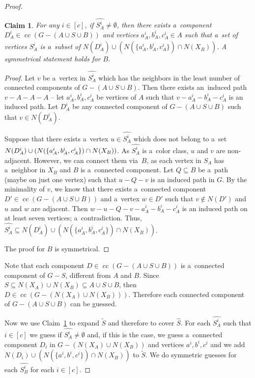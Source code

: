 \documentclass[11pt,a4paper]{article}
\DeclareMathOperator{\cc}{cc}
\newtheorem{claim}[theorem]{Claim}
\theoremstyle{definition}
\begin{document}
\begin{proof}
\begin{claim}\label{cl:other_components}
    For any $i \in [c]$, if $\widehat{S_A^i} \neq \emptyset$,
    then there exists a~component $D_A^i\in \cc(G-(A\cup S\cup B))$ and vertices $a_A^i,b_A^i,c_A^i\in A$ such that a~set of vertices $\widehat{S_A^i}$ is a~subset of $N(D_A^i)\cup (N(\{a_A^i, b_A^i, c_A^i\})\cap N(X_B))$. A symmetrical statement holds for $B$. 
\end{claim}
\begin{proof}
    Let $v$ be a~vertex in $\widehat{S_A^i}$ which has the neighbors in the least number of connected components of $G-(A\cup S\cup B)$. 
    Then there exists an~induced path $v-A-A-A$ -- let $a_A^i, b_A^i, c_A^i$ be vertices of $A$ such that $v-a_A^i-b_A^i-c_A^i$ is an induced path. 
    Let $D_A^i$ be any connected component of $G-(A\cup S\cup B)$ such that $v\in N(D_A^i)$. 
    
    Suppose that there exists a~vertex $u\in \widehat{S_A^i}$ which does not belong to a~set $N(D_A^i)\cup (N(\{a_A^i, b_A^i, c_A^i\}) \linebreak \cap N(X_B))$. As $\widehat{S_A^i}$ is a~color class, $u$ and $v$ are non-adjacent. 
    However, we can connect them via~$B$, as each vertex in $S_A$ has a~neighbor in $X_B$ and $B$ is a~connected component. Let $Q\subseteq B$ be a~path (maybe on just one vertex) such that $u-Q-v$ is an induced path in $G$.
    By the minimality of $v$, we know that there exists a~connected component $D'\in \cc(G-(A\cup S\cup B))$ and a~vertex $w\in D'$ such that $v\notin N(D')$ and $u$ and $w$ are adjacent. Then $w-u-Q-v-a_A^i-b_A^i-c_A^i$ is an induced path on at least seven vertices; a~contradiction. Thus, $\widehat{S_A^i}\subseteq N(D_A^i)\cup (N(\{a_A^i, b_A^i, c_A^i\})\cap N(X_B))$.

    The proof for $B$ is symmetrical.
\end{proof}

Note that each component $D\in \cc(G-(A\cup S\cup B))$ is a~connected component of $G-S$, different from $A$ and $B$. Since $S\subseteq N(X_A)\cup N(X_B)\subseteq A\cup S\cup B$, then $D\in \cc(G-(N(X_A)\cup N(X_B)))$. Therefore each connected component of $G-(A \cup S \cup B)$ can be guessed.

Now we use Claim~\ref{cl:other_components} to expand $\widetilde{S}$ and therefore to cover $\widehat{S}$. For each $\widehat{S_A^i}$ such that $i\in[c]$ we guess
if $\widehat{S_A^i} \neq \emptyset$ and, if this is the case, we guess a~connected component $D_i$ in $G-(N(X_A)\cup N(X_B))$ and vertices $a^i, b^i, c^i$ and we add $N(D_i)\cup \left(N(\{a^i, b^i, c^i\})\cap N(X_B)\right)$ to $\widetilde{S}$. We do symmetric guesses for each $\widehat{S_B^i}$ for each $i\in [c]$. 


\end{proof}
\end{document}

